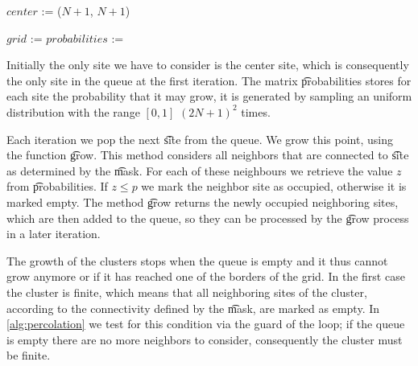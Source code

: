 \begin{algorithm}[t]
	\SetAlgoShortEnd
	\DontPrintSemicolon
	\BlankLine

	$center$ := ($N + 1$, $N + 1$)\; 

	\; 
	$grid$ := \; 
	$probabilities$ := \; 

	\; 
	\caption{$(mask, N, p)$\label{alg:percolation}}
\end{algorithm}

Initially the only site we have to consider is the center site, which is consequently the only site in the queue at the first iteration. The matrix \t{probabilities} stores for each site the probability that it may grow, it is generated by sampling an uniform distribution with the range $[0,1]$ $(2N + 1)^2$ times. 

Each iteration we pop the next \t{site} from the queue. We grow this point, using the function \t{grow}. This method considers all neighbors that are connected to \t{site} as determined by the \t{mask}. For each of these neighbours we retrieve the value $z$ from \t{probabilities}. If $z \leq p$ we mark the neighbor site as occupied, otherwise it is marked empty. The method \t{grow} returns the newly occupied neighboring sites, which are then added to the queue, so they can be processed by the \t{grow} process in a later iteration.

The growth of the clusters stops when the queue is empty and it thus cannot grow anymore or if it has reached one of the borders of the grid. In the first case the cluster is finite, which means that all neighboring sites of the cluster, according to the connectivity defined by the \t{mask}, are marked as empty. In \cref{alg:percolation} we test for this condition via the guard of the loop; if the queue is empty there are no more neighbors to consider, consequently the cluster must be finite. 

